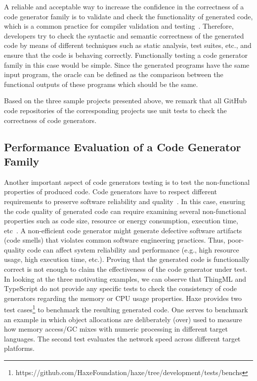 A reliable and acceptable way to increase the confidence in the correctness of a code generator family is to validate and check the functionality of generated code, which is a common practice for compiler validation and testing~\cite{jorges2014back,stuermer2007systematic,sturmer2005overview}.
Therefore, developers try to check the syntactic and semantic correctness of the generated code by means of different techniques such as static analysis, test suites, etc., and ensure that the code is behaving correctly.  
Functionally testing a code generator family in this case would be simple. Since the generated programs have the same input program, the oracle can be defined as the comparison between the functional outputs of these programs which should be the same.

Based on the three sample projects presented above, we remark that all GitHub code repositories of the corresponding projects use unit tests to check the correctness of code generators.  

\subsection{Performance Evaluation of a Code Generator Family}

Another important aspect of code generators testing is to test the non-functional properties of produced code. 
Code generators have to respect different requirements to preserve software reliability and quality~\cite{demertzi2011analyzing}. 
In this case, ensuring the code quality of generated code can require examining several non-functional properties such as code size, resource or energy consumption, execution time, etc~\cite{pan2006fast}.
A non-efficient code generator might generate defective software artifacts (code smells) that violates common software engineering practices. 
Thus, poor-quality code can affect system reliability and performance (e.g., high resource usage, high execution time, etc.).
Proving that the generated code is functionally correct is not enough to claim the effectiveness of the code generator under test. In looking at the three motivating examples, we can observe that ThingML and TypeScript do not provide any specific tests to check the consistency of code generators regarding the memory or CPU usage properties. Haxe provides two test cases\footnote{https://github.com/HaxeFoundation/haxe/tree/development/tests/benchs} to benchmark the resulting generated code. One serves to benchmark an example in which object allocations are deliberately (over) used to measure how memory access/GC mixes with numeric processing in different target languages. The second test evaluates the network speed across different target platforms.

